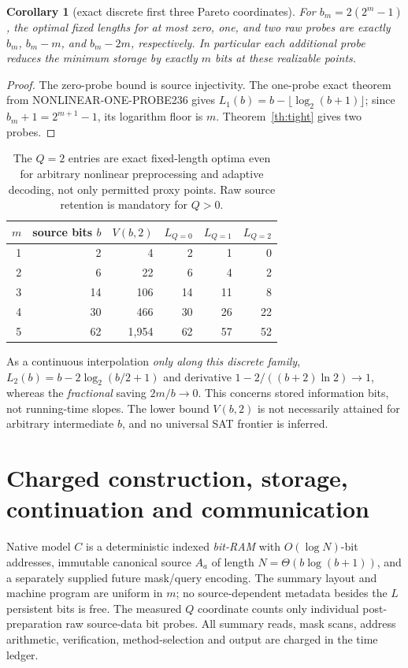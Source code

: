 \documentclass[10pt]{article}
\newtheorem{corollary}[theorem]{Corollary}
\begin{document}
\begin{corollary}[exact discrete first three Pareto coordinates]
For $b_m=2(2^m-1)$, the optimal fixed lengths for at most zero, one, and two raw probes are exactly $b_m$, $b_m-m$, and $b_m-2m$, respectively. In particular each additional probe reduces the minimum storage by exactly $m$ bits at these realizable points.
\end{corollary}
\begin{proof}
The zero-probe bound is source injectivity. The one-probe exact theorem from NONLINEAR-ONE-PROBE236 gives $L_1(b)=b-\lfloor\log_2(b+1)\rfloor$; since $b_m+1=2^{m+1}-1$, its logarithm floor is $m$. Theorem~\ref{th:tight} gives two probes.
\end{proof}

\begin{table}[ht]\centering\small
\begin{tabular}{@{}rrrrrr@{}}\toprule
$m$&source bits $b$&$V(b,2)$&$L_{Q=0}$&$L_{Q=1}$&$L_{Q=2}$\\\midrule
1&2&4&2&1&0\\
2&6&22&6&4&2\\
3&14&106&14&11&8\\
4&30&466&30&26&22\\
5&62&1,954&62&57&52\\\bottomrule
\end{tabular}
\caption{The $Q=2$ entries are exact fixed-length optima even for arbitrary nonlinear preprocessing and adaptive decoding, not only permitted proxy points. Raw source retention is mandatory for $Q>0$.}
\end{table}

\noindent As a continuous interpolation \emph{only along this discrete family}, $L_2(b)=b-2\log_2(b/2+1)$ and derivative $1-2/((b+2)\ln2)\to1$, whereas the \emph{fractional} saving $2m/b\to0$. This concerns stored information bits, not running-time slopes. The lower bound $V(b,2)$ is not necessarily attained for arbitrary intermediate $b$, and no universal SAT frontier is inferred.

\section{Charged construction, storage, continuation and communication}
Native model $C$ is a deterministic indexed \emph{bit-RAM} with $O(\log N)$-bit addresses, immutable canonical source $A_a$ of length $N=\Theta(b\log(b+1))$, and a separately supplied future mask/query encoding. The summary layout and machine program are uniform in $m$; no source-dependent metadata besides the $L$ persistent bits is free. The measured $Q$ coordinate counts only individual post-preparation raw source-data bit probes. All summary reads, mask scans, address arithmetic, verification, method-selection and output are charged in the time ledger.
\end{document}
